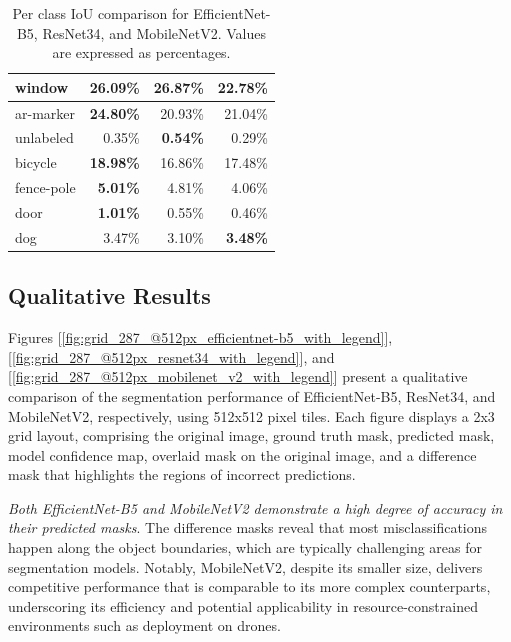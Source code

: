 \documentclass[a4paper]{article}
\begin{document}
\begin{table}[htbp]
\begin{tabular}{|l|r|r|r|}
    window         & 26.09\% & \textbf{26.87}\% & 22.78\% \\ \hline
    ar-marker      & \textbf{24.80\%} & 20.93\% & 21.04\% \\ \hline
    unlabeled      & 0.35\%  & \textbf{0.54\%}  & 0.29\%  \\ \hline
    bicycle        & \textbf{18.98\%} & 16.86\% & 17.48\% \\ \hline
    fence-pole     & \textbf{5.01\%}  & 4.81\%  & 4.06\%  \\ \hline
    door           & \textbf{1.01\%}  & 0.55\%  & 0.46\%  \\ \hline
    dog            & 3.47\%  & 3.10\%  & \textbf{3.48\%}  \\ \hline
    \end{tabular}
    \caption{Per class IoU comparison for EfficientNet-B5, ResNet34, and MobileNetV2. Values are expressed as percentages.}
    \label{table:per_class_iou}
\end{table}

\subsection{Qualitative Results}

Figures [\ref{fig:grid_287_@512px_efficientnet-b5_with_legend}], [\ref{fig:grid_287_@512px_resnet34_with_legend}], and [\ref{fig:grid_287_@512px_mobilenet_v2_with_legend}] present a qualitative comparison of the segmentation performance of EfficientNet-B5, ResNet34, and MobileNetV2, respectively, using 512x512 pixel tiles. Each figure displays a 2x3 grid layout, comprising the original image, ground truth mask, predicted mask, model confidence map, overlaid mask on the original image, and a difference mask that highlights the regions of incorrect predictions.

\textit{Both EfficientNet-B5 and MobileNetV2 demonstrate a high degree of accuracy in their predicted masks}. The difference masks reveal that most misclassifications happen along the object boundaries, which are typically challenging areas for segmentation models. Notably, MobileNetV2, despite its smaller size, delivers competitive performance that is comparable to its more complex counterparts, underscoring its efficiency and potential applicability in resource-constrained environments such as deployment on drones.
\end{document}
